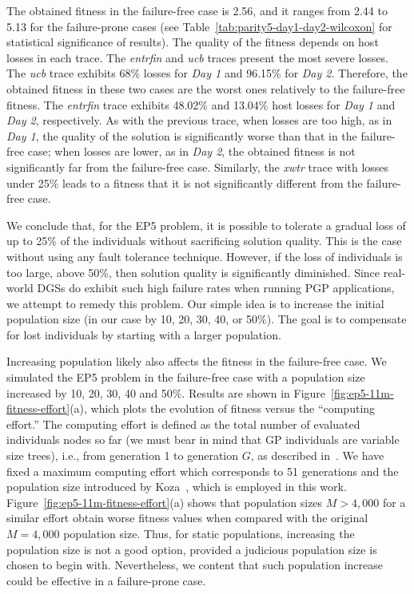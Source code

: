 \documentclass[graybox]{sty/svmult}
\begin{document}
The obtained fitness in the failure-free case is 2.56, and
it ranges from 2.44 to 5.13 for the failure-prone cases (see
Table~\ref{tab:parity5-day1-day2-wilcoxon} for statistical significance of
results).  The quality of the fitness depends on host losses in each
trace. The \emph{entrfin} and \emph{ucb} traces present the most severe
losses. The \emph{ucb}
trace exhibits 68\% losses for \emph{Day 1} and 96.15\% for \emph{Day
2}. Therefore, the obtained fitness in these two cases are the worst
ones relatively to the failure-free fitness.  The \emph{entrfin} trace
exhibits 48.02\% and 13.04\% host losses for \emph{Day 1} and \emph{Day 2},
respectively. As with the previous trace, when losses are too high, as
in \emph{Day 1}, the quality of the solution is significantly worse than
that in the failure-free case; when losses are lower, as in \emph{Day 2},
the obtained fitness is not significantly far from the failure-free case.
Similarly, the \emph{xwtr} trace with losses under 25\% leads to a
fitness that it is not significantly different from the failure-free case.

We conclude that, for the EP5 problem, it is possible to tolerate
a gradual loss of up to 25\% of the individuals without sacrificing
solution quality. This is the case without using any fault tolerance
technique.  However, if the loss of individuals is too
large, above 50\%, then solution quality is significantly diminished.
Since real-world DGSs do exhibit such high failure rates when
running PGP applications, we attempt to remedy this problem. Our simple
idea is to increase the initial population size (in our case by 10,
20, 30, 40, or 50\%). The goal is to compensate for lost individuals by
starting with a larger population.

Increasing population likely also affects the fitness in the failure-free
case.  We simulated the EP5 problem in the failure-free case with a
population size increased by 10, 20, 30, 40 and 50\%. Results are shown
in Figure~\ref{fig:ep5-11m-fitness-effort}(a), which plots the evolution
of fitness versus the ``computing effort.'' The computing effort is
defined as the total number of evaluated individuals nodes so far (we must bear in mind that GP individuals are variable size
trees), i.e., from
generation 1 to generation $G$, as described in~\cite{plague}.  We have
fixed a maximum computing effort which corresponds to 51 generations
and the population size introduced by Koza~\cite{koza:book}, which is
employed in this work. Figure~\ref{fig:ep5-11m-fitness-effort}(a) shows
that population sizes $M>4,000$ for a similar effort obtain worse
fitness values when compared with the original $M=4,000$ population size. Thus, for static populations,
increasing the population size is not a good option, provided a judicious
population size is chosen to begin with. Nevertheless, we content that
such population increase could be effective in a failure-prone case.
\end{document}
